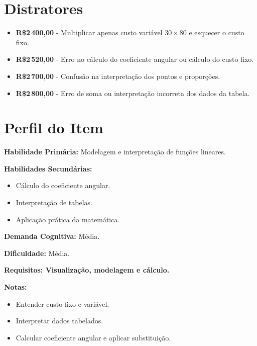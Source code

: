 \documentclass{article}
\begin{document}
\section*{Distratores}

\begin{itemize}
  \item \textbf{R\$2\,400,00} - Multiplicar apenas custo variável $30\times 80$ e esquecer o custo fixo.
  \item \textbf{R\$2\,520,00} - Erro no cálculo do coeficiente angular ou cálculo do custo fixo.
  \item \textbf{R\$2\,700,00} - Confusão na interpretação dos pontos e proporções.
  \item \textbf{R\$2\,800,00} - Erro de soma ou interpretação incorreta dos dados da tabela.
\end{itemize}

\section*{Perfil do Item}

\textbf{Habilidade Primária:} Modelagem e interpretação de funções lineares.

\textbf{Habilidades Secundárias:}
\begin{itemize}
  \item Cálculo do coeficiente angular.
  \item Interpretação de tabelas.
  \item Aplicação prática da matemática.
\end{itemize}

\textbf{Demanda Cognitiva:} Média.

\textbf{Dificuldade:} Média.

\textbf{Requisitos: Visualização, modelagem e cálculo.}

\textbf{Notas:}
\begin{itemize}
  \item Entender custo fixo e variável.
  \item Interpretar dados tabelados.
  \item Calcular coeficiente angular e aplicar substituição.
\end{itemize}
\end{document}
